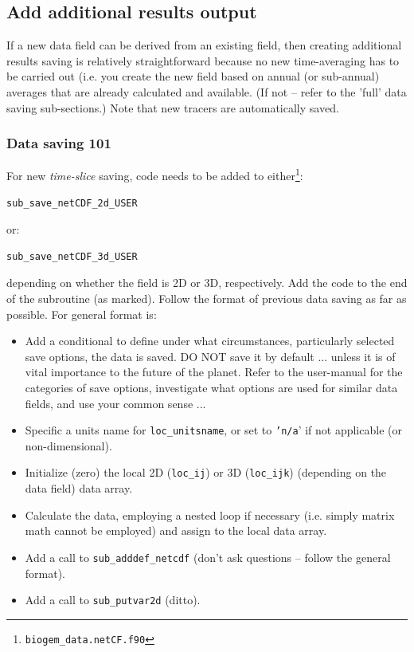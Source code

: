 \documentclass[11pt,fleqn]{book} %
\begin{document}
\subsection{Add additional results output}\label{Add new output}

If a new data field can be derived from an existing field, then creating additional results saving is relatively straightforward because no new time-averaging has to be carried out (i.e. you create the new field based on annual (or sub-annual) averages that are already calculated and available. (If not -- refer to the 'full' data saving sub-sections.) Note that new tracers are automatically saved.

%
\subsubsection{Data saving 101}

For new \textit{time-slice} saving, code needs to be added to either\footnote{\texttt{biogem\_data.netCF.f90}}:
\vspace{-1mm}\small\begin{verbatim}
sub_save_netCDF_2d_USER
\end{verbatim}\vspace{-1mm}\normalsize
or:
\vspace{-1mm}\small\begin{verbatim}
sub_save_netCDF_3d_USER
\end{verbatim}\vspace{-1mm}\normalsize
depending on whether the field is 2D or 3D, respectively. Add the code to the end of the subroutine (as marked). Follow the format of previous data saving as far as possible. For general format is:
\begin{itemize}[noitemsep]
\item Add a conditional to define under what circumstances, particularly selected save options, the data is saved. DO NOT save it by default ... unless it is of vital importance to the future of the planet. Refer to the user-manual for the categories of save options, investigate what options are used for similar data fields, and use your common sense ...
\item Specific a units name for \texttt{loc\_unitsname}, or set to \texttt{'n/a}' if not applicable (or non-dimensional).
\item Initialize (zero) the local 2D (\texttt{loc\_ij}) or 3D (\texttt{loc\_ijk}) (depending on the data field) data array.
\item Calculate the data, employing a nested loop if necessary (i.e. simply matrix math cannot be employed) and assign to the local data array.
\item Add a call to \texttt{sub\_adddef\_netcdf} (don't ask questions -- follow the general format).
\item Add a call to \texttt{sub\_putvar2d} (ditto).
\end{itemize}
\end{document}
